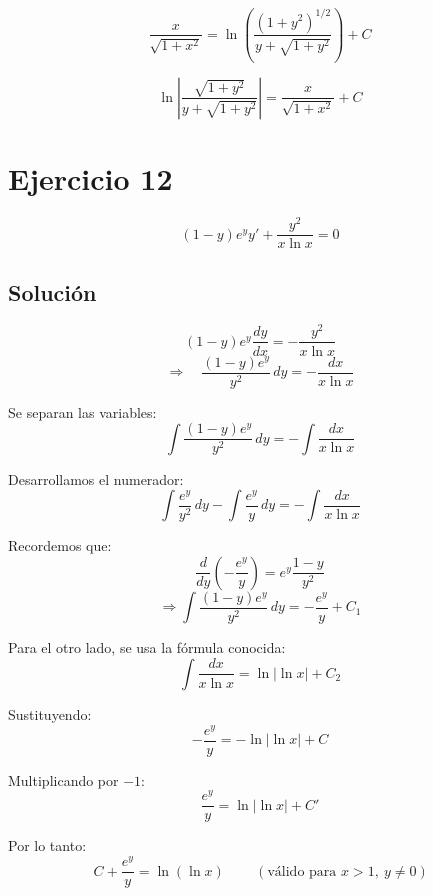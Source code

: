 \documentclass[12pt,a4paper]{article}
\begin{document}
\begin{multicols}{2}
\[
\frac{x}{\sqrt{1+x^2}} = \ln\!\left(\frac{(1+y^2)^{1/2}}{y+\sqrt{1+y^2}}\right) + C
\]

\[
\boxed{
\ln\left\lvert
\frac{\sqrt{1+y^2}}{y+\sqrt{1+y^2}}
\right\rvert
=
\frac{x}{\sqrt{1+x^2}} + C
}
\]


\section*{Ejercicio 12}
\[(1-y)e^yy\prime+\frac{y^2}{x\ln x}=0\]

\subsection*{Solución}
\[
(1-y)e^{y}\frac{dy}{dx} = -\frac{y^{2}}{x\ln x}
\]
\[
\Rightarrow\quad
\frac{(1-y)e^{y}}{y^{2}}\,dy = -\frac{dx}{x\ln x}
\]

\noindent
Se separan las variables:
\[
\int \frac{(1-y)e^{y}}{y^{2}}\,dy = -\int \frac{dx}{x\ln x}
\]

\noindent
Desarrollamos el numerador:
\[
\int \frac{e^{y}}{y^{2}}\,dy - \int \frac{e^{y}}{y}\,dy = -\int \frac{dx}{x\ln x}
\]

\noindent
Recordemos que:
\[
\frac{d}{dy}\left(-\frac{e^{y}}{y}\right)=e^{y}\frac{1-y}{y^{2}}
\]
\[
\Rightarrow 
\int \frac{(1-y)e^{y}}{y^{2}}\,dy = -\frac{e^{y}}{y} + C_1
\]
\columnbreak

\noindent
Para el otro lado, se usa la fórmula conocida:
\[
\int \frac{dx}{x\ln x} = \ln|\ln x| + C_2
\]

\noindent
Sustituyendo:
\[
-\frac{e^{y}}{y} = -\ln|\ln x| + C
\]

\noindent
Multiplicando por $-1$:
\[
\frac{e^{y}}{y} = \ln|\ln x| + C'
\]

\noindent
Por lo tanto:
\[
\boxed{\,C + \frac{e^{y}}{y} = \ln(\ln x)\,}
\qquad (\text{válido para }x>1,\ y\neq0)
\]

\end{multicols}
\end{document}

